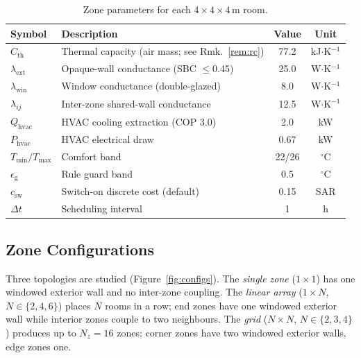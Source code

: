\documentclass[3p,number]{elsarticle}
\let\oldsubsection\subsection
\renewcommand{\subsection}{\FloatBarrier\oldsubsection}
\newcommand{\Tmin}{T_{\min}}
\newcommand{\Tmax}{T_{\max}}
\newcommand{\Cth}{C_{\mathrm{th}}}
\newcommand{\lext}{\lambda_{\mathrm{ext}}}
\newcommand{\lwin}{\lambda_{\mathrm{win}}}
\newcommand{\lij}{\lambda_{ij}}
\newcommand{\Qhvac}{Q_{\mathrm{hvac}}}
\newcommand{\csw}{c_{\mathrm{sw}}}
\newcommand{\Phvac}{P_{\mathrm{hvac}}}
\begin{document}
\begin{table}[!t]
\centering
\caption{Zone parameters for each $4\times4\times4\,\text{m}$ room.}
\label{tab:params}
\setlength{\tabcolsep}{4.5pt}
\begin{tabularx}{\linewidth}{lXcc}
\toprule
Symbol & Description & Value & Unit \\
\midrule
$\Cth$   & Thermal capacity (air mass; see Rmk.~\ref{rem:rc}) & 77.2 & kJ$\cdot$K$^{-1}$\\
$\lext$  & Opaque-wall conductance (SBC $\le$0.45)   & 25.0 & W$\cdot$K$^{-1}$ \\
$\lwin$  & Window conductance (double-glazed)         &  8.0 & W$\cdot$K$^{-1}$ \\
$\lij$   & Inter-zone shared-wall conductance         & 12.5 & W$\cdot$K$^{-1}$ \\
$\Qhvac$ & HVAC cooling extraction (COP 3.0)         &  2.0 & kW \\
$\Phvac$ & HVAC electrical draw                       & 0.67 & kW \\
$\Tmin/\Tmax$ & Comfort band                         & 22/26 & $^\circ$C \\
$\epsilon_{\mathrm{g}}$ & Rule guard band             &  0.5 & $^\circ$C \\
$\csw$       & Switch-on discrete cost (default)      & 0.15 & SAR \\
$\Delta t$  & Scheduling interval                     &    1 & h \\
\bottomrule
\end{tabularx}
\end{table}
 
\subsection{Zone Configurations}
\label{subsec:configs}
 
Three topologies are studied (Figure~\ref{fig:configs}).
The \emph{single zone} ($1\times1$) has one windowed exterior wall and no inter-zone coupling.
The \emph{linear array} ($1\times N$, $N\in\{2,4,6\}$) places $N$ rooms in a row; end zones have one windowed exterior wall while interior zones couple to two neighbours.
The \emph{grid} ($N\times N$, $N\in\{2,3,4\}$) produces up to $N_z=16$ zones; corner zones have two windowed exterior walls, edge zones one.
 
\end{document}
